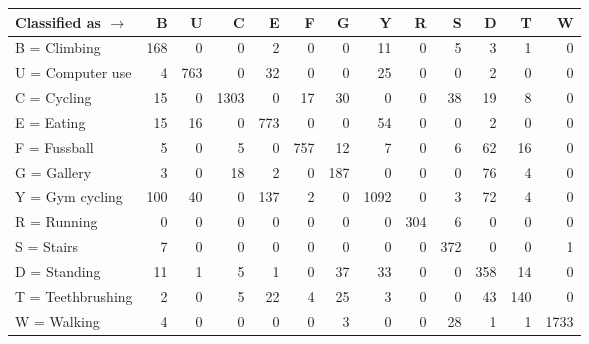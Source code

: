 \begin{tabular}{lrrrrrrrrrrrr}
\toprule
Classified as $\rightarrow$ &    B &    U &     C &    E &    F &    G &     Y &    R &    S &    D &    T &     W \\
\midrule
B = Climbing      &  168 &    0 &     0 &    2 &    0 &    0 &    11 &    0 &    5 &    3 &    1 &     0 \\
U = Computer use  &    4 &  763 &     0 &   32 &    0 &    0 &    25 &    0 &    0 &    2 &    0 &     0 \\
C = Cycling       &   15 &    0 &  1303 &    0 &   17 &   30 &     0 &    0 &   38 &   19 &    8 &     0 \\
E = Eating        &   15 &   16 &     0 &  773 &    0 &    0 &    54 &    0 &    0 &    2 &    0 &     0 \\
F = Fussball      &    5 &    0 &     5 &    0 &  757 &   12 &     7 &    0 &    6 &   62 &   16 &     0 \\
G = Gallery       &    3 &    0 &    18 &    2 &    0 &  187 &     0 &    0 &    0 &   76 &    4 &     0 \\
Y = Gym cycling   &  100 &   40 &     0 &  137 &    2 &    0 &  1092 &    0 &    3 &   72 &    4 &     0 \\
R = Running       &    0 &    0 &     0 &    0 &    0 &    0 &     0 &  304 &    6 &    0 &    0 &     0 \\
S = Stairs        &    7 &    0 &     0 &    0 &    0 &    0 &     0 &    0 &  372 &    0 &    0 &     1 \\
D = Standing      &   11 &    1 &     5 &    1 &    0 &   37 &    33 &    0 &    0 &  358 &   14 &     0 \\
T = Teethbrushing &    2 &    0 &     5 &   22 &    4 &   25 &     3 &    0 &    0 &   43 &  140 &     0 \\
W = Walking       &    4 &    0 &     0 &    0 &    0 &    3 &     0 &    0 &   28 &    1 &    1 &  1733 \\
\bottomrule
\end{tabular}
